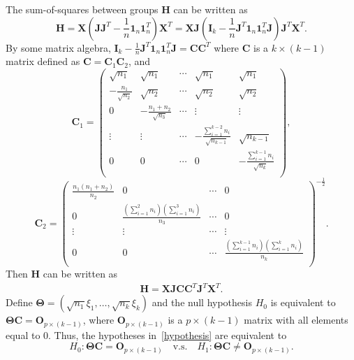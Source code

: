\documentclass[12pt]{article} %
\newcommand{\bX}{\mathbf{X}}
\newcommand{\bH}{\mathbf{H}}
\newcommand{\bJ}{\mathbf{J}}
\newcommand{\bC}{\mathbf{C}}
\newcommand{\bO}{\mathbf{O}}
\newcommand{\bI}{\mathbf{I}}
\newcommand{\bfsym}[1]{\ensuremath{\boldsymbol{#1}}}
\def\bTheta {\bfsym {\Theta}}
\theoremstyle{definition}
\begin{document}
The sum-of-squares between groups $\bH$ can be written as
$$
        \bH=\bX(\bJ\bJ^T-\frac{1}{n}\mathbf{1}_n\mathbf{1}_n^T)\bX^T
=\bX \bJ(\bI_k-\frac{1}{n}\bJ^T\mathbf{1}_n \mathbf{1}_n^T \bJ)\bJ^T \bX^T.
$$
By some matrix algebra, $\bI_k-\frac{1}{n}\bJ^T\mathbf{1}_n \mathbf{1}_n^T \bJ=\bC\bC^T$
where $\bC$ is a $k\times (k-1)$ matrix defined as $\bC=\bC_1\bC_2$, and
 $$
\bC_1=\begin{pmatrix}
    \sqrt{n_1}&\sqrt{n_1}&\cdots&\sqrt{n_1}&\sqrt{n_1}\\
    -\frac{n_1}{\sqrt{n_2}}&\sqrt{n_2}&\cdots&\sqrt{n_2}&\sqrt{n_2}\\
    0&-\frac{n_1+n_2}{\sqrt{n_3}}&\cdots&\vdots&\vdots\\
    \vdots&\vdots&\cdots&-\frac{\sum_{i=1}^{k-2}n_i}{\sqrt{n_{k-1}}}&\sqrt{n_{k-1}}\\
    0&0&\cdots&0&-\frac{\sum_{i=1}^{k-1}n_i}{\sqrt{n_k}}\\
\end{pmatrix},
 $$
 $$
\bC_2=\begin{pmatrix}
    \frac{n_1(n_1+n_2)}{n_2}&0&\cdots&0\\
    0&\frac{(\sum_{i=1}^2 n_i)(\sum_{i=1}^3 n_i)}{n_3}&\cdots&0\\
    \vdots&\vdots&\cdots&\vdots\\
    0&0&\cdots&\frac{(\sum_{i=1}^{k-1} n_i)(\sum_{i=1}^k n_i)}{n_{k}}\\
\end{pmatrix}^{-\frac{1}{2}}.
$$
Then $\bH$ can be written as
\begin{equation*}
    \begin{aligned}
        \bH=\bX \bJ\bC \bC^T \bJ^T \bX^T.
    \end{aligned}
\end{equation*}
 Define $\bTheta=(\sqrt{n_1}\xi_1,\ldots,\sqrt{n_k}\xi_k)$
 and the null hypothesis $H_0$ is equivalent to $\bTheta \bC=\bO_{p\times (k-1)}$, where $\bO_{p\times (k-1)}$ is a $p\times (k-1)$ matrix with all elements equal to $0$.
 Thus, the hypotheses in~\eqref{hypothesis} are equivalent to
 $$
 H_0:\bTheta \bC=\bO_{p\times (k-1)}\quad \text{v.s.}\quad H_1: \bTheta \bC\neq \bO_{p\times (k-1)}.
 $$
\end{document}
